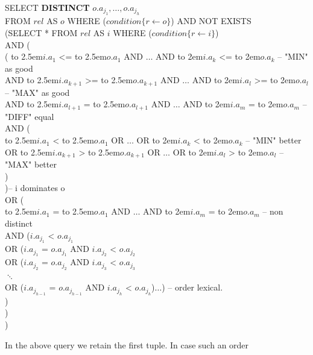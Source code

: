 %
\begin{sql}
\newcommand\abox[1]{\hbox to 2.5em{#1\hfil}}%
\newcommand\bbox[1]{\hbox to 2em{#1\hfil}}%
SELECT \textbf{DISTINCT} $o.a_{j_1}, \ldots, o.a_{j_h}$ \\
FROM $rel$ AS $o$ WHERE ($condition\{r \gets o\}$) AND NOT EXISTS \\
(SELECT * FROM $rel$ AS $i$ WHERE ($condition\{r \gets i\}$)\\
AND (\\
({ }{ }{ }{ }{ }\abox{$i.a_1$} <= \abox{$o.a_1$} AND $\ldots$ AND \bbox{$i.a_k$} <= \bbox{$o.a_k$} -- "MIN" as good\\
AND \abox{$i.a_{k+1}$} >= \abox{$o.a_{k+1}$} AND $\ldots$ AND \bbox{$i.a_l$} >= \bbox{$o.a_l$} -- "MAX" as good\\
AND \abox{$i.a_{l+1}$} { }= \abox{$o.a_{l+1}$} AND $\ldots$ AND \bbox{$i.a_m$} { }= \bbox{$o.a_m$} -- "DIFF" equal \\
AND (\\
\phantom{{ }{ }{ }}\abox{$i.a_1$} < \abox{$o.a_1$} OR $\ldots$ OR \bbox{$i.a_k$} < \bbox{$o.a_k$} -- "MIN" better \\
OR \abox{$i.a_{k+1}$} > \abox{$o.a_{k+1}$} OR $\ldots$ OR \bbox{$i.a_l$} > \bbox{$o.a_l$} -- "MAX" better \\
)\\
)-- i dominates o\\
OR (\\
\phantom{AND }\abox{$i.a_1$} { }= \abox{$o.a_1$} AND $\ldots$ AND \bbox{$i.a_m$} { }= \bbox{$o.a_m$} -- non distinct\\
AND ($i.a_{j_1}$ < $o.a_{j_1}$\\
OR ($i.a_{j_1}$ = $o.a_{j_1}$ AND $i.a_{j_2}$ < $o.a_{j_2}$\\
OR ($i.a_{j_2}$ = $o.a_{j_2}$ AND $i.a_{j_3}$ < $o.a_{j_3}$\\
$\ddots$\\
OR ($i.a_{j_{h-1}}$ = $o.a_{j_{h-1}}$ AND $i.a_{j_h}$ < $o.a_{j_h}$)$\ldots$) -- order lexical.\\
)\\
)\\
)
\end{sql}
%
In the above query we retain the first tuple. In case such an order

